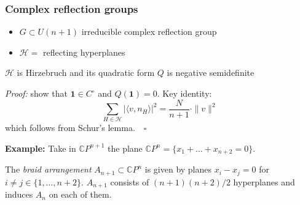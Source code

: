 \documentclass{beamer}
\newcommand{\mH}{\mathcal{H}}
\begin{document}
\begin{frame}
	\frametitle{Complex reflection groups}
	\begin{itemize}
		\item \(G \subset U(n+1)\) irreducible complex reflection group
		\item \(\mH = \) reflecting hyperplanes
	\end{itemize}

	\begin{theorem}[dB-Panov, 2024]
		\(\mH\) is Hirzebruch and its quadratic form \(Q\) is negative semidefinite
	\end{theorem}
	
	\emph{Proof:} show that \(\mathbf{1} \in C^{\circ}\) and \(Q(\mathbf{1}) = 0\). Key identity:
	\[
	\sum_{H \in \mH} | \langle v, n_H \rangle |^2 = \frac{N}{n+1} \cdot \| v \|^2  
	\]
	which follows from Schur's lemma. \,\, \(\square\)
	
	\textbf{Example:} Take in $\mathbb CP^{n+1}$ the plane $\mathbb CP^n=\{x_1+\ldots+x_{n+2}=0\}$.
	
	The \emph{braid arrangement} $A_{n+1}\subset\mathbb CP^n$ is given by planes $x_i-x_j=0$ for $i\ne j\in \{1,\ldots,n+2\}$.
	$A_{n+1}$ consists of $(n+1)(n+2)/2$ hyperplanes and induces $A_n$ on each of them.
\end{frame}
\end{document}
